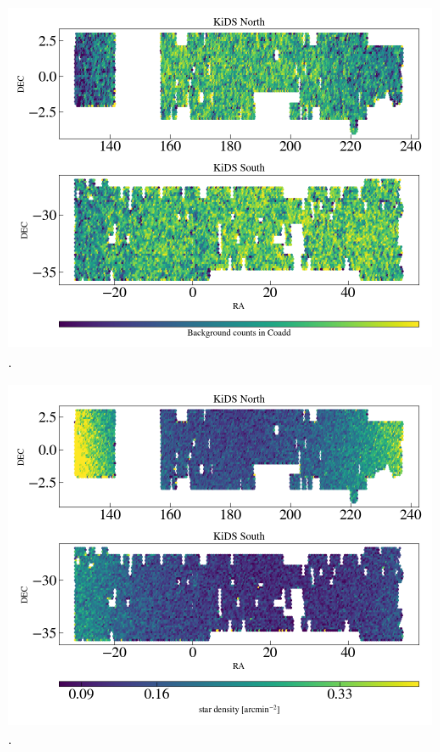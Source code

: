 \documentclass[fleqn,usenatbib,useAMS]{mnras}
\begin{document}
\begin{figure}
\includegraphics[width=\textwidth]{figures_tmp/sys/scatter_BackGr.png}
\caption{\label{fig:scatter_fwhm} .} 
\end{figure}

\begin{figure}
\includegraphics[width=\textwidth]{figures_tmp/sys/scatter_nstar.png}
\caption{\label{fig:scatter_fwhm} .} 
\end{figure}
\end{document}
